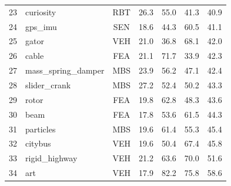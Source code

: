 \documentclass{ieeeaccess}
\begin{document}
\begin{table}[htbp]
{\begin{tabular}{rlccccc}
    23 & curiosity & RBT & 26.3 & 55.0 & 41.3 & 40.9 \\
    24 & gps\_imu & SEN & 18.6 & 44.3 & 60.5 & 41.1 \\
    25 & gator & VEH & 21.0 & 36.8 & 68.1 & 42.0 \\
    26 & cable & FEA & 21.1 & 71.7 & 33.9 & 42.3 \\
    27 & mass\_spring\_damper & MBS & 23.9 & 56.2 & 47.1 & 42.4 \\
    28 & slider\_crank & MBS & 27.2 & 52.4 & 50.2 & 43.3 \\
    29 & rotor & FEA & 19.8 & 62.8 & 48.3 & 43.6 \\
    30 & beam & FEA & 17.8 & 53.6 & 61.5 & 44.3 \\
    31 & particles & MBS & 19.6 & 61.4 & 55.3 & 45.4 \\
    32 & citybus & VEH & 19.6 & 50.4 & 67.4 & 45.8 \\
    33 & rigid\_highway & VEH & 21.2 & 63.6 & 70.0 & 51.6 \\
    34 & art & VEH & 17.9 & 82.2 & 75.8 & 58.6 \\
    \bottomrule
    \end{tabular}
    }
\end{table}
\end{document}
